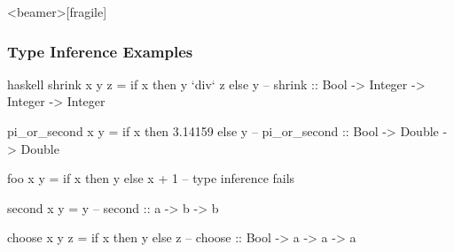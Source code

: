 \documentclass[dvipsnames]{beamer}
\theoremstyle{plain}
\begin{document}
\begin{frame}<beamer>[fragile]
  \frametitle{Type Inference Examples}

  \begin{example}[Haskell]
    \begin{pygments}{haskell}
shrink x y z = if x then y `div` z else y
-- shrink :: Bool -> Integer -> Integer -> Integer

pi_or_second x y = if x then 3.14159 else y
-- pi_or_second :: Bool -> Double -> Double

foo x y = if x then y else x + 1
-- type inference fails

second x y = y
-- second :: a -> b -> b

choose x y z = if x then y else z
-- choose :: Bool -> a -> a -> a
    \end{pygments}
  \end{example}
\end{frame}
% 
% 
% 
\end{document}
